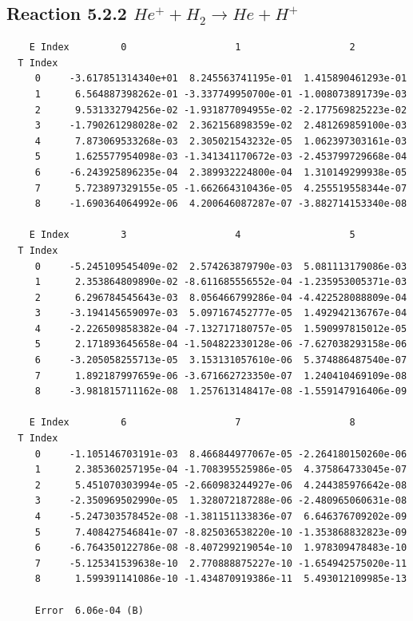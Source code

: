 \documentclass[12pt,dvipdfmx]{article}
\begin{document}
\newpage
\subsection{
Reaction 5.2.2 $   He^+ + H_2 \rightarrow He + H^+$}


\begin{small}\begin{verbatim}
    E Index         0                   1                   2
  T Index
     0     -3.617851314340e+01  8.245563741195e-01  1.415890461293e-01
     1      6.564887398262e-01 -3.337749950700e-01 -1.008073891739e-03
     2      9.531332794256e-02 -1.931877094955e-02 -2.177569825223e-02
     3     -1.790261298028e-02  2.362156898359e-02  2.481269859100e-03
     4      7.873069533268e-03  2.305021543232e-05  1.062397303161e-03
     5      1.625577954098e-03 -1.341341170672e-03 -2.453799729668e-04
     6     -6.243925896235e-04  2.389932224800e-04  1.310149299938e-05
     7      5.723897329155e-05 -1.662664310436e-05  4.255519558344e-07
     8     -1.690364064992e-06  4.200646087287e-07 -3.882714153340e-08

    E Index         3                   4                   5
  T Index
     0     -5.245109545409e-02  2.574263879790e-03  5.081113179086e-03
     1      2.353864809890e-02 -8.611685556552e-04 -1.235953005371e-03
     2      6.296784545643e-03  8.056466799286e-04 -4.422528088809e-04
     3     -3.194145659097e-03  5.097167452777e-05  1.492942136767e-04
     4     -2.226509858382e-04 -7.132717180757e-05  1.590997815012e-05
     5      2.171893645658e-04 -1.504822330128e-06 -7.627038293158e-06
     6     -3.205058255713e-05  3.153131057610e-06  5.374886487540e-07
     7      1.892187997659e-06 -3.671662723350e-07  1.240410469109e-08
     8     -3.981815711162e-08  1.257613148417e-08 -1.559147916406e-09

    E Index         6                   7                   8
  T Index
     0     -1.105146703191e-03  8.466844977067e-05 -2.264180150260e-06
     1      2.385360257195e-04 -1.708395525986e-05  4.375864733045e-07
     2      5.451070303994e-05 -2.660983244927e-06  4.244385976642e-08
     3     -2.350969502990e-05  1.328072187288e-06 -2.480965060631e-08
     4     -5.247303578452e-08 -1.381151133836e-07  6.646376709202e-09
     5      7.408427546841e-07 -8.825036538220e-10 -1.353868832823e-09
     6     -6.764350122786e-08 -8.407299219054e-10  1.978309478483e-10
     7     -5.125341539638e-10  2.770888875227e-10 -1.654942575020e-11
     8      1.599391141086e-10 -1.434870919386e-11  5.493012109985e-13

     Error  6.06e-04 (B)
\end{verbatim}\end{small}
\end{document}
